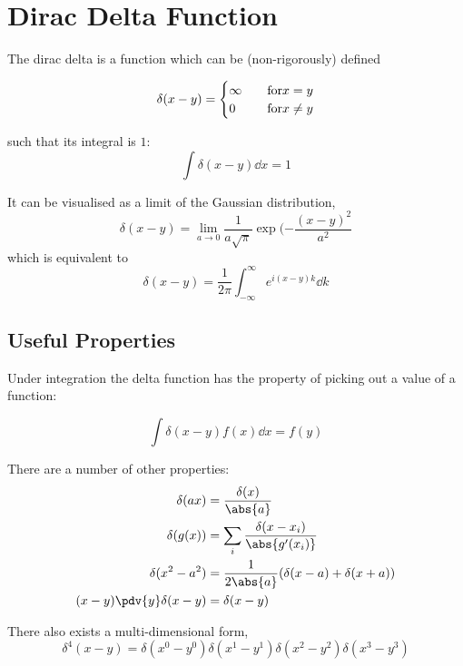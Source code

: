 
\section{Dirac Delta Function}
\label{sec:dirac-delta-function}

The dirac delta is a function which can be (non-rigorously) defined 
\begin{namedequation}
  \begin{equation}
    \label{eq:11}
    \delta(x-y) = 
    \begin{cases}
      \infty &\text{\quad for} x = y \\
      0 &\text{\quad for} x \neq y
    \end{cases}
  \end{equation}
\end{namedequation}
such that its integral is $1$:
\[ \int \delta(x-y) \dd{x} = 1 \]

It can be visualised as a limit of the Gaussian distribution,
\[ \delta(x-y) = \lim_{a \to 0} \frac{1}{ a \sqrt{\pi} } \exp( -
\frac{(x-y)^2}{a^2} \]
which is equivalent to
\[ \delta(x-y) = \frac{1}{2 \pi} \int_{- \infty}^{\infty} e^{i(x-y)k}
\dd{k} \]

\subsection{Useful Properties}
\label{sec:useful-properties}

Under integration the delta function has the property of picking out a
value of a function:

\begin{equation}
  \label{eq:12}
  \int \delta(x-y) f(x) \dd{x} = f(y)
\end{equation}

There are a number of other properties:
\begin{subequations}
\begin{align}
  \delta(ax) &= \frac{\delta(x)}{\abs{a}} \\
  \delta( g(x) ) &= \sum_i \frac{\delta(x - x_i)}{\abs{g^{\prime} (x_i)}} \\
  \delta(x^2 - a^2) &= \frac{1}{2 \abs{a}} ( \delta(x-a) + \delta(x+a) ) \\
  (x - y) \pdv{y} \delta(x-y) &= \delta(x - y)
\end{align}
\end{subequations}

There also exists a multi-dimensional form,
\begin{equation}
  \label{eq:13}
  \delta^4(x-y) = \delta(x^0 - y^0) \delta(x^1 - y^1) \delta(x^2 - y^2) \delta(x^3 - y^3)
\end{equation}

